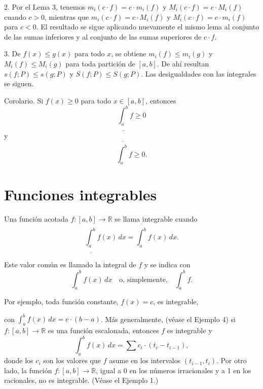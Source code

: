 \documentclass[12pt,oneside]{book}
\begin{document}
2. Por el Lema 3, tenemos \( m_i(c \cdot f) = c \cdot m_i(f) \) y \( M_i(c \cdot f) = c \cdot M_i(f) \) cuando \( c > 0 \), mientras que \( m_i(c \cdot f) = c \cdot M_i(f) \) y \( M_i(c \cdot f) = c \cdot m_i(f) \) para \( c < 0 \). El resultado se sigue aplicando nuevamente el mismo lema al conjunto de las sumas inferiores y al conjunto de las sumas superiores de \( c \cdot f \).

3. De \( f(x) \leq g(x) \) para todo \( x \), se obtiene \( m_i(f) \leq m_i(g) \) y \( M_i(f) \leq M_i(g) \) para toda partición de \([a, b]\). De ahí resultan \( s(f; P) \leq s(g; P) \) y \( S(f; P) \leq S(g; P) \). Las desigualdades con las integrales se siguen.

Corolario. Si \( f(x) \geq 0 \) para todo \( x \in [a, b] \), entonces
\[
\underline{\int_a^b} f \geq 0
\]
y
\[
\overline{\int_a^b} f \geq 0.
\]

\section{Funciones integrables}

Una función acotada \(f: [a, b] \to \mathbb{R}\) se llama integrable cuando
\[
\underline{\int_a^b} f(x) \, dx = \overline{\int_a^b} f(x) \, dx.
\]

Este valor común es llamado la integral de \(f\) y se indica con
\[
\int_a^b f(x) \, dx \quad \text{o, simplemente,} \quad \int_a^b f.
\]

Por ejemplo, toda función constante, \(f(x) = c\), es integrable,

con \(\int_a^b f(x) \, dx = c \cdot (b - a)\). Más generalmente, (véase el Ejemplo 4) si \(f: [a, b] \to \mathbb{R}\) es una función escalonada, entonces \(f\) es integrable y
\[
\int_a^b f(x) \, dx = \sum c_i \cdot (t_i - t_{i-1}),
\]
donde los \(c_i\) son los valores que \(f\) asume en los intervalos \((t_{i-1}, t_i)\). Por otro lado, la función \(f: [a, b] \to \mathbb{R}\), igual a 0 en los números irracionales y a 1 en los racionales, no es integrable. (Véase el Ejemplo 1.)
\end{document}
